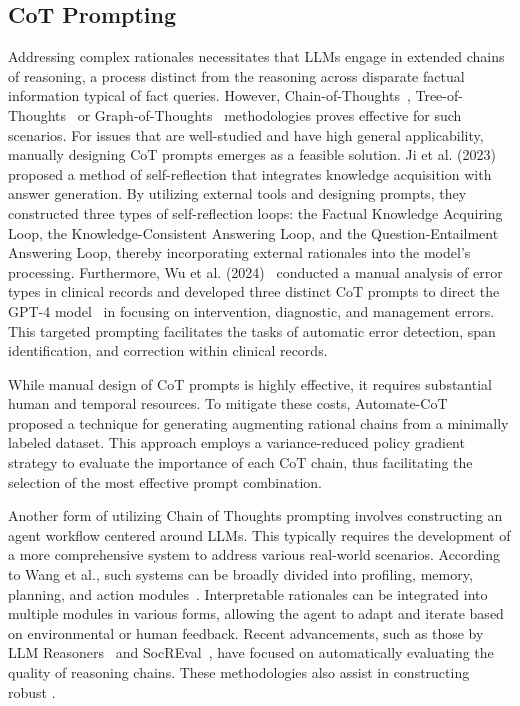 \subsection{CoT Prompting}

Addressing complex rationales necessitates that LLMs engage in extended chains of reasoning, a process distinct from the reasoning across disparate factual information typical of fact queries. However, Chain-of-Thoughts~\cite{wei2022chain}, Tree-of-Thoughts~\cite{yao2024tree} or Graph-of-Thoughts~\cite{yao2023beyond} methodologies proves effective for such scenarios. For issues that are well-studied and have high general applicability, manually designing CoT prompts emerges as a feasible solution. Ji et al. (2023)~\cite{ji2023towards} proposed a method of self-reflection that integrates knowledge acquisition with answer generation. By utilizing external tools and designing prompts, they constructed three types of self-reflection loops: the Factual Knowledge Acquiring Loop, the Knowledge-Consistent Answering Loop, and the Question-Entailment Answering Loop, thereby incorporating external rationales into the model's processing. Furthermore, Wu et al. (2024)~\cite{wu2024chain} conducted a manual analysis of error types in clinical records and developed three distinct CoT prompts to direct the GPT-4 model~\cite{achiam2023gpt} in focusing on intervention, diagnostic, and management errors. This targeted prompting facilitates the tasks of automatic error detection, span identification, and correction within clinical records.

While manual design of CoT prompts is highly effective, it requires substantial human and temporal resources. To mitigate these costs, Automate-CoT~\cite{shum2023automatic} proposed a technique for generating augmenting rational chains from a minimally labeled dataset. This approach employs a variance-reduced policy gradient strategy to evaluate the importance of each CoT chain, thus facilitating the selection of the most effective prompt combination.

Another form of utilizing Chain of Thoughts prompting involves constructing an agent workflow centered around LLMs. This typically requires the development of a more comprehensive system to address various real-world scenarios. According to Wang et al., such systems can be broadly divided into profiling, memory, planning, and action modules~\cite{wang2024survey}. Interpretable rationales can be integrated into multiple modules in various forms, allowing the agent to adapt and iterate based on environmental or human feedback. Recent advancements, such as those by LLM Reasoners~\cite{hao2024llm} and SocREval~\cite{he2024socreval}, have focused on automatically evaluating the quality of reasoning chains. These methodologies also assist in constructing robust \app{}.

